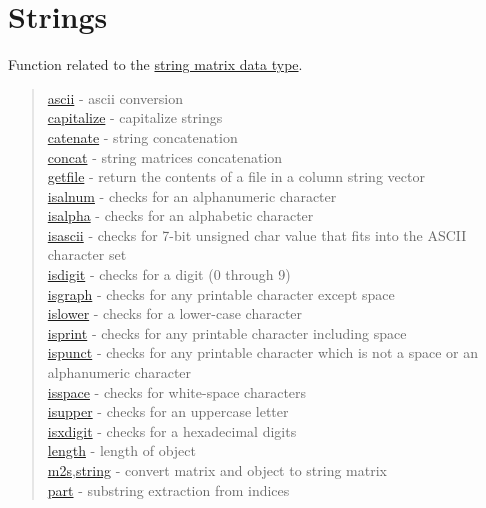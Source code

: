\chapter*{Strings}
\hypertarget{StringsChapter}{}

Function related to the \hyperlink{Smat}{string matrix data type}.

\begin{quote}
\noindent
\hyperlink{ascii}{ascii} - ascii conversion  \\
\hyperlink{capitalize}{capitalize} - capitalize strings\\
\hyperlink{catenate}{catenate} - string concatenation  \\
\hyperlink{concat}{concat} - string matrices concatenation  \\
\hyperlink{getfile}{getfile} - return the contents of a file in a column string vector  \\
\hyperlink{isalnum}{isalnum} - checks for an alphanumeric character\\
\hyperlink{isalpha}{isalpha} - checks for an alphabetic character\\
\hyperlink{isascii}{isascii} - checks for 7-bit unsigned char value that fits into the ASCII character set\\
\hyperlink{isdigit}{isdigit} - checks for a digit (0 through 9)\\
\hyperlink{isgraph}{isgraph} - checks for any printable character except space\\
\hyperlink{islower}{islower} - checks for a lower-case character\\
\hyperlink{isprint}{isprint} - checks for any printable character including space\\
\hyperlink{ispunct}{ispunct} - checks for any printable character which is not a space or an alphanumeric character\\
\hyperlink{isspace}{isspace} - checks for white-space characters\\
\hyperlink{isupper}{isupper} - checks for an uppercase letter\\
\hyperlink{isxdigit}{isxdigit} - checks for a hexadecimal digits\\
\hyperlink{length}{length} - length of object  \\
\hyperlink{m2s}{m2s},\hyperlink{string}{string} - convert matrix and object to string matrix  \\
\hyperlink{part}{part} - substring extraction from indices\\

\end{quote}
